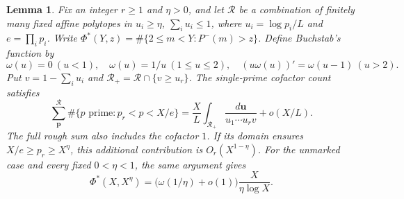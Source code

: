 \documentclass[11pt,a4paper]{article}
\theoremstyle{paperplain}
\newtheorem{lemma}[theorem]{Lemma}
\numberwithin{equation}{section}
\begin{document}
\begin{lemma}\label{arith:reference}
Fix an integer $r\ge1$ and $\eta>0$, and let $\mathcal R$ be a combination of
finitely many fixed affine polytopes in
$u_i\ge\eta$, $\sum_i u_i\le1$, where
$u_i=\log p_i/L$ and $e=\prod_i p_i$.
Write $\Phi^*(Y,z)=\#\{2\le m<Y:P^-(m)>z\}$.
Define Buchstab's function by
\[
 \omega(u)=0\ (u<1),\quad \omega(u)=1/u\ (1\le u\le2),\quad
 (u\omega(u))'=\omega(u-1)\ (u>2).
\]
Put $v=1-\sum_i u_i$ and $\mathcal R_+=\mathcal R\cap\{v\ge u_r\}$.
The single-prime cofactor count satisfies
\begin{equation}\label{arith:prime-density}
 \sum_{\boldsymbol p}^{\mathcal R}\#\{p\text{ prime}:p_r<p<X/e\}
 =\frac XL\int_{\mathcal R_+}\frac{d\boldsymbol u}{u_1\cdots u_r v}
   +o(X/L).
\end{equation}
The full rough sum also includes the cofactor $1$.
If its domain ensures $X/e\ge p_r\ge X^\eta$, this additional
contribution is $O_r(X^{1-\eta})$.
For the unmarked case and every fixed $0<\eta<1$, the same argument gives
\begin{equation}\label{arith:unmarked-reference}
 \Phi^*(X,X^\eta)
 =\bigl(\omega(1/\eta)+o(1)\bigr)\frac{X}{\eta\log X}.
\end{equation}
\end{lemma}
\end{document}
